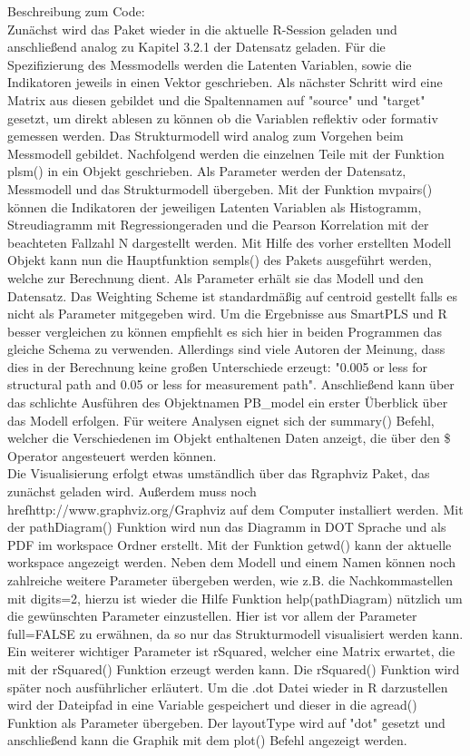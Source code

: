 \documentclass{article}\usepackage[]{graphicx}\usepackage[]{color}
\begin{document}
Beschreibung zum Code:\\
Zunächst wird das Paket wieder in die aktuelle R-Session geladen und anschließend analog zu Kapitel 3.2.1 der Datensatz geladen. Für die Spezifizierung des Messmodells werden die Latenten Variablen, sowie die Indikatoren jeweils in einen Vektor geschrieben. Als nächster Schritt wird eine Matrix aus diesen gebildet und die Spaltennamen auf "source" und "target" gesetzt, um direkt ablesen zu können ob die Variablen reflektiv oder formativ gemessen werden. Das Strukturmodell wird analog zum Vorgehen beim Messmodell gebildet. Nachfolgend werden die einzelnen Teile mit der Funktion plsm() in ein Objekt geschrieben. Als Parameter werden der Datensatz, Messmodell und das Strukturmodell übergeben. Mit der Funktion mvpairs() können die Indikatoren der jeweiligen Latenten Variablen als Histogramm, Streudiagramm mit Regressiongeraden und die Pearson Korrelation mit der beachteten Fallzahl N dargestellt werden. Mit Hilfe des vorher erstellten Modell Objekt kann nun die Hauptfunktion sempls() des Pakets ausgeführt werden, welche zur Berechnung dient. Als Parameter erhält sie das Modell und den Datensatz. Das Weighting Scheme ist standardmäßig auf centroid gestellt falls es nicht als Parameter mitgegeben wird. Um die Ergebnisse aus SmartPLS und R besser vergleichen zu können empfiehlt es sich hier in beiden Programmen das gleiche Schema zu verwenden. Allerdings sind viele Autoren der Meinung, dass dies in der Berechnung keine großen Unterschiede erzeugt: "0.005 or less for structural path and 0.05 or less for measurement path".\cite{noonan1982pls} Anschließend kann über das schlichte Ausführen des Objektnamen PB\_model ein erster Überblick über das Modell erfolgen. Für weitere Analysen eignet sich der summary() Befehl, welcher die Verschiedenen im Objekt enthaltenen Daten anzeigt, die über den \$ Operator angesteuert werden können. \\
Die Visualisierung erfolgt etwas umständlich über das Rgraphviz Paket, das zunächst geladen wird. Außerdem muss noch href{http://www.graphviz.org/}{Graphviz} auf dem Computer installiert werden. Mit der pathDiagram() Funktion wird nun das Diagramm in DOT Sprache und als PDF im workspace Ordner erstellt. Mit der Funktion getwd() kann der aktuelle workspace angezeigt werden. Neben dem Modell und einem Namen können noch zahlreiche weitere Parameter übergeben werden, wie z.B. die Nachkommastellen mit digits=2, hierzu ist wieder die Hilfe Funktion help(pathDiagram) nützlich um die gewünschten Parameter einzustellen. Hier ist vor allem der Parameter full=FALSE zu erwähnen, da so nur das Strukturmodell visualisiert werden kann. Ein weiterer wichtiger Parameter ist rSquared, welcher eine Matrix erwartet, die mit der rSquared() Funktion erzeugt werden kann. Die rSquared() Funktion wird später noch ausführlicher erläutert. Um die .dot Datei wieder in R darzustellen wird der Dateipfad in eine Variable gespeichert und dieser in die agread() Funktion als Parameter übergeben. Der layoutType wird auf "dot" gesetzt und anschließend kann die Graphik mit dem plot() Befehl angezeigt werden.\\
\end{document}

